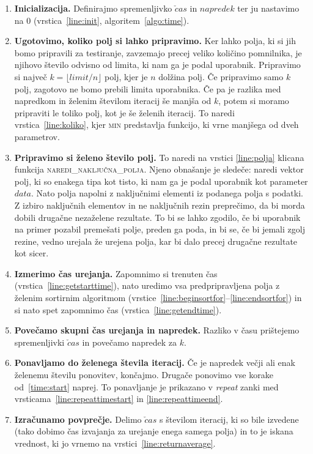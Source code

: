 \documentclass[a4paper,oneside,12pt]{article}
\begin{document}
\begin{enumerate}
  \item \textbf{Inicializacija.} Definirajmo spremenljivko $\check{c}as$ in $napredek$ ter ju nastavimo na 0
    (vrstica~\ref{line:init}, algoritem~\ref{algo:time}).
  \item \textbf{Ugotovimo, koliko polj si lahko pripravimo.} \label{time:start} Ker lahko 
    polja, ki si jih bomo pripravili za testiranje, zavzemajo precej veliko količino
    pomnilnika, je njihovo število odvisno od
    limita, ki nam ga je podal uporabnik. Pripravimo si največ $k = \lfloor limit/n \rfloor$
    polj, kjer je $n$ dolžina polj.
    Če pripravimo samo $k$ polj, zagotovo ne bomo prebili limita uporabnika.
    Če pa je razlika med napredkom in želenim številom iteracij še manjša
    od $k$, potem si  moramo pripraviti le toliko polj, kot je še želenih iteracij.
    To naredi vrstica~\ref{line:koliko}, kjer \textsc{min} predstavlja funkcijo, ki vrne
    manjšega od dveh parametrov.
  \item \textbf{Pripravimo si želeno število polj.} To naredi na vrstici
   \ref{line:polja} klicana funkcija \textsc{naredi\_naključna\_polja}. Njeno obnašanje
    je sledeče: naredi vektor polj, ki so enakega tipa kot tisto, ki nam ga je podal 
    uporabnik kot parameter $data$. Nato polja napolni z
    naključnimi elementi iz podanega polja s podatki. Z izbiro naključnih elementov in ne 
    naključnih rezin preprečimo, da bi morda dobili drugačne nezaželene rezultate. To bi
    se lahko zgodilo, če bi uporabnik na primer pozabil premešati polje, preden ga poda, in bi se, če bi jemali 
    zgolj rezine, vedno urejala že urejena polja, kar bi dalo precej drugačne rezultate 
    kot sicer.
  \item \textbf{Izmerimo čas urejanja.} Zapomnimo si trenuten čas (vrstica~\ref{line:getstarttime}), nato uredimo vsa 
    predpripravljena polja z želenim
    sortirnim algoritmom (vrstice~\ref{line:beginsortfor}--\ref{line:endsortfor}) in si
    nato spet zapomnimo čas (vrstica~\ref{line:getendtime}).
  \item \textbf{Povečamo skupni čas urejanja in napredek.} Razliko v času prištejemo spremenljivki $\check{c}as$ in povečamo napredek za $k$. 
  \item \textbf{Ponavljamo do želenega števila iteracij.} Če je napredek večji ali enak želenemu številu ponovitev, končajmo. 
    Drugače ponovimo vse korake od~\ref{time:start} naprej. To ponavljanje je prikazano v
    \emph{repeat} zanki med vrsticama~\ref{line:repeattimestart} in
   \ref{line:repeattimeend}.
  \item \textbf{Izračunamo povprečje.} Delimo $\check{c}as$ s številom iteracij, ki so bile izvedene (tako dobimo čas
    izvajanja za urejanje enega samega polja) in to je iskana vrednost, ki jo vrnemo na
    vrstici~\ref{line:returnaverage}.
\end{enumerate}
\end{document}
